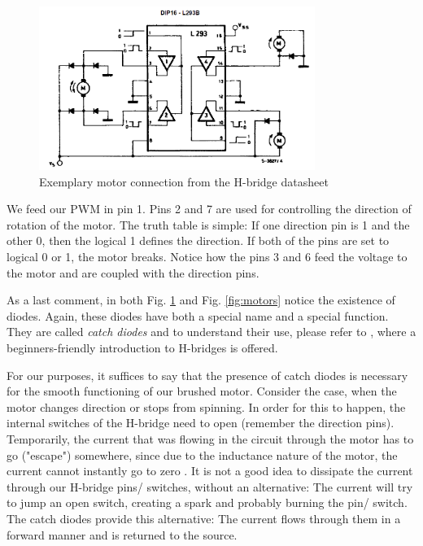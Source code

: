 \begin{figure}[htb]
    \centering
    \includegraphics[width=0.8\textwidth]{figures/hardware/HbridgeDatasheet.PNG}
    \caption{Exemplary motor connection from the H-bridge datasheet}
    \label{fig:HData}
\end{figure}

\FloatBarrier

We feed our PWM in pin 1. Pins 2 and 7 are used for controlling the direction of rotation of the motor. The truth table is simple: If one direction pin is 1 and the other 0, then the logical 1 defines the direction. If both of the pins are set to logical 0 or 1, the motor breaks. Notice how the pins 3 and 6 feed the voltage to the motor and are coupled with the direction pins.

As a last comment, in both Fig. \ref{fig:HData} and Fig. \ref{fig:motors} notice the existence of diodes. Again, these diodes have both a special name and a special function. They are called \textit{catch diodes} and to understand their use, please refer to \cite{catchDiodes}, where a beginners-friendly introduction to H-bridges is offered.

For our purposes, it suffices to say that the presence of catch diodes is necessary for the smooth functioning of our brushed motor. Consider the case, when the motor changes direction or stops from spinning. In order for this to happen, the internal switches of the H-bridge need to open (remember the direction pins). Temporarily, the current that was flowing in the circuit through the motor has to go ("escape") somewhere, since due to the inductance nature of the motor, the current cannot instantly go to zero . It is not a good idea to dissipate the current through our H-bridge pins/ switches, without an alternative: The current will try to jump an open switch, creating a spark and probably burning the pin/ switch. The catch diodes provide this alternative: The current flows through them in a forward manner and is returned to the source.

